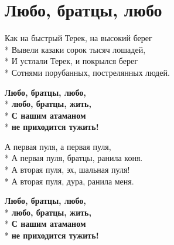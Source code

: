 \vspace{\fill}\newpage

\section{Любо, братцы, любо}
\label{song:Любо,_братцы,_любо}

\medskip

\begin{minipage}{\linewidth}
Как на быстрый Терек, на высокий берег\\*
Вывели казаки сорок тысяч лошадей,\\*
И устлали Терек, и покрылся берег\\*
Сотнями порубанных, пострелянных людей.\\
\end{minipage}\par\medskip\nobreak

\medskip

\begin{minipage}{\linewidth}
\hspace*{1.5em}\textbf{Любо, братцы, любо,}\\*
\hspace*{1.5em}\textbf{любо, братцы, жить,}\\*
\hspace*{1.5em}\textbf{С нашим атаманом}\\*
\hspace*{1.5em}\textbf{не приходится тужить!}\\
\end{minipage}\par\medskip\nobreak

\medskip

\begin{minipage}{\linewidth}
А первая пуля, а первая пуля,\\*
А первая пуля, братцы, ранила коня.\\*
А вторая пуля, эх, шальная пуля!\\*
А вторая пуля, дура, ранила меня.\\
\end{minipage}\par\medskip\nobreak

\medskip

\begin{minipage}{\linewidth}
\hspace*{1.5em}\textbf{Любо, братцы, любо,}\\*
\hspace*{1.5em}\textbf{любо, братцы, жить,}\\*
\hspace*{1.5em}\textbf{С нашим атаманом}\\*
\hspace*{1.5em}\textbf{не приходится тужить!}\\
\end{minipage}\par\medskip\nobreak

